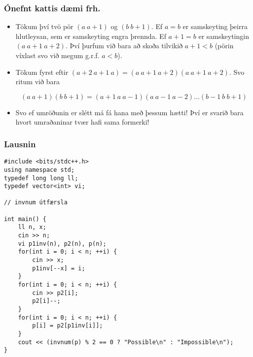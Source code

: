 \documentclass{beamer}
\begin{document}
\begin{frame}
\frametitle{Ónefnt kattis dæmi frh.}

\begin{itemize}

\item<1-> Tökum því tvö pör $(a \ a + 1)$ og $(b \ b + 1)$. Ef $a = b$ er samskeyting þeirra hlutleysan, sem er samskeyting engra þrennda. Ef $a + 1 = b$ er samskeytingin $(a \ a + 1 \ a + 2)$. Því þurfum við bara að skoða tilvikið $a + 1 < b$ (pörin víxlast svo við megum g.r.f. $a < b$).

\item<2-> Tökum fyrst eftir $(a + 2 \ a + 1 \ a) = (a \ a + 1 \ a + 2)(a \ a + 1 \ a + 2)$. Svo ritum við bara

\[(a \ a + 1)(b \ b + 1) = (a + 1 \ a \ a - 1)(a \ a - 1 \ a - 2)\dots(b - 1 \ b \ b + 1)\]

\item<3-> Svo ef umröðunin er slétt má fá hana með þessum hætti! Því er svarið bara hvort umraðaninar tvær hafi sama formerki!

\end{itemize}

\end{frame}

\begin{frame}[fragile]
\frametitle{Lausnin}

\begin{scriptsize}
\begin{verbatim}
#include <bits/stdc++.h>
using namespace std;
typedef long long ll;
typedef vector<int> vi;

// invnum útfærsla

int main() {
    ll n, x;
    cin >> n;
    vi p1inv(n), p2(n), p(n);
    for(int i = 0; i < n; ++i) {
        cin >> x;
        p1inv[--x] = i;
    }
    for(int i = 0; i < n; ++i) {
        cin >> p2[i];
        p2[i]--;
    }
    for(int i = 0; i < n; ++i) {
        p[i] = p2[p1inv[i]];
    }
    cout << (invnum(p) % 2 == 0 ? "Possible\n" : "Impossible\n");
}
\end{verbatim}
\end{scriptsize}

\end{frame}
\end{document}
